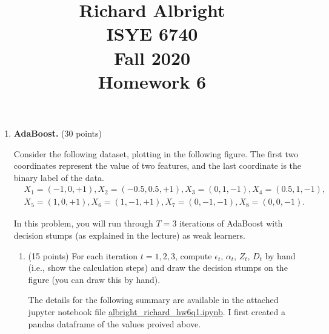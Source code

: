 \documentclass[twoside,10pt]{article}
\begin{document}
\title{Richard Albright\\
ISYE 6740\\ 
Fall 2020\\
Homework 6}
\date{}
\maketitle







\begin{enumerate}


\item  {\bf AdaBoost.} (30 points)

Consider the following dataset, plotting in the following figure. The first two coordinates represent the value of two features, and the last coordinate is the binary label of the data.
\begin{equation*}
\begin{split}
&X_1 = (-1, 0, +1), X_2 = (-0.5, 0.5, +1), X_3 = (0, 1, -1), X_4 = (0.5, 1, -1), \\
&X_5 = (1, 0, +1), X_6 = (1, -1, +1), X_7 = (0, -1, -1), X_8 = (0, 0, -1).
\end{split}
\end{equation*}

In this problem, you will run through $T = 3$ iterations of AdaBoost with decision stumps (as explained in the lecture) as weak learners.

\begin{enumerate}
\item (15 points) For each iteration $t = 1, 2, 3$, compute $\epsilon_t$, $\alpha_t$, $Z_t$, $D_t$ by hand (i.e., show the calculation steps) and draw the decision stumps on the figure (you can draw this by hand). 

\vspace{5 mm}

The details for the following summary are available in the attached jupyter notebook file \url{albright_richard_hw6q1.ipynb}.  I first created a pandas dataframe of the values proived above.


\end{enumerate}
\end{enumerate}
\end{document}

